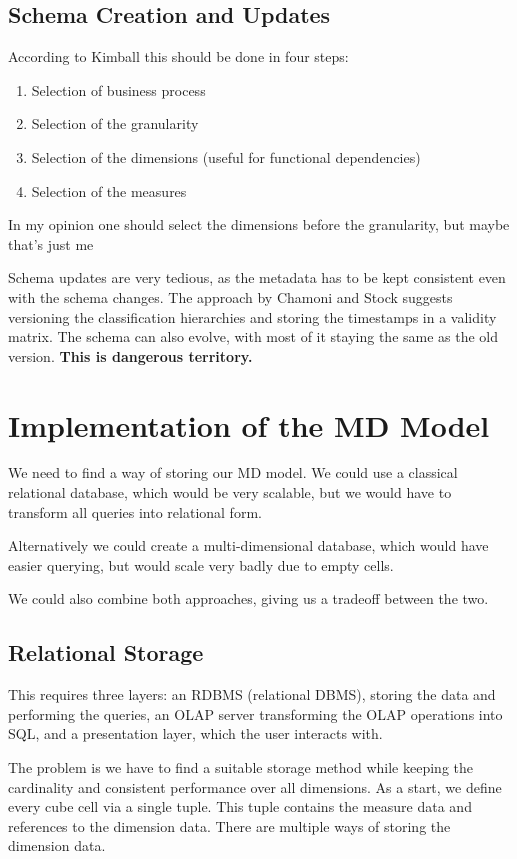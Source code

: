 \documentclass{article}
\begin{document}
\subsection{Schema Creation and Updates}
According to Kimball this should be done in four steps:
\begin{enumerate}
    \item Selection of business process
    \item Selection of the granularity
    \item Selection of the dimensions (useful for functional dependencies)
    \item Selection of the measures
\end{enumerate}
\begin{keypointbox}
    In my opinion one should select the dimensions before the granularity, but maybe that's just me
\end{keypointbox}

Schema updates are very tedious, as the metadata has to be kept consistent even with the schema changes.
The approach by Chamoni and Stock suggests versioning the classification hierarchies and storing the timestamps in a validity matrix.
The schema can also evolve, with most of it staying the same as the old version.
\textbf{This is dangerous territory.}

\section{Implementation of the MD Model}
We need to find a way of storing our MD model.
We could use a classical relational database, which would be very scalable, but we would have to transform all queries into relational form.

Alternatively we could create a multi-dimensional database, which would have easier querying, but would scale very badly due to empty cells.

We could also combine both approaches, giving us a tradeoff between the two.

\subsection{Relational Storage}
This requires three layers: an RDBMS (relational DBMS), storing the data and performing the queries, an OLAP server transforming the OLAP operations into SQL, and a presentation layer, which the user interacts with.

The problem is we have to find a suitable storage method while keeping the cardinality and consistent performance over all dimensions.
As a start, we define every cube cell via a single tuple.
This tuple contains the measure data and references to the dimension data.
There are multiple ways of storing the dimension data.
\end{document}
